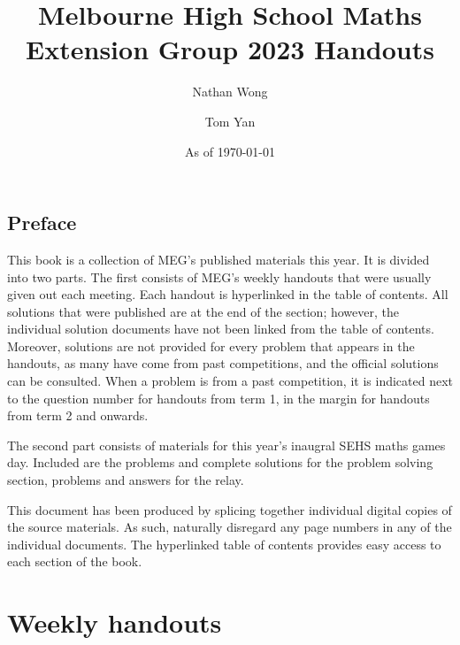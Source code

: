 \documentclass[a4paper]{book}
\title{\textbf{Melbourne High School Maths Extension Group 2023 Handouts}}
\author{Nathan Wong\and Tom Yan}
\date{As of \today}
\begin{document}
\maketitle
\chapter*{Preface}
This book is a collection of MEG's published
materials this year. 
It is divided into two parts.
The first consists of MEG's weekly handouts
that were usually given out each meeting.
Each handout is hyperlinked in the table of contents.
All solutions that were published are
at the end of the section; however, the individual
solution documents have not been linked from the table
of contents. Moreover, solutions are not provided
for every problem that appears in the handouts,
as many have come from past competitions, and the official
solutions can be consulted.
When a problem is from a past competition, it is indicated
next to the question number for handouts from term 1, in the margin
for handouts from term 2 and onwards.

The second part consists of materials for this year's inaugral
SEHS maths games day. Included
are the problems and complete solutions for the problem
solving section, problems and answers for the relay.

This document has been produced by splicing together
individual digital copies of the source materials.
As such, naturally disregard any page numbers in any
of the individual documents. The hyperlinked table of contents
provides easy access to each section of the book.
\tableofcontents
\part{Weekly handouts}








\end{document}
